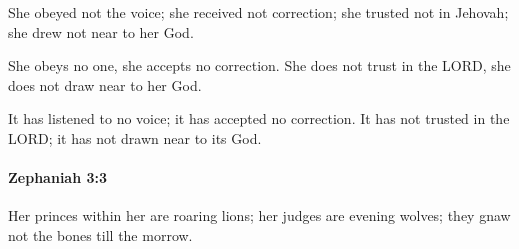 			\begin{versebox}
					\item[BHS] 
					\item[LXX] 
					\item[ASV] She obeyed not the voice; she received not correction; she trusted not in Jehovah; she drew not near to her God.
					\item[NIV] She obeys no one, she accepts no correction. She does not trust in the LORD, she does not draw near to her God.
					\item[NRSV] It has listened to no voice; it has accepted no correction. It has not trusted in the LORD; it has not drawn near to its God.
			\end{versebox}

		\paragraph{Zephaniah 3:3} %
			\label{ZEPHANIAH-3-3}

			Her princes within her are roaring lions; her judges are evening wolves; they gnaw not the bones till the morrow.

